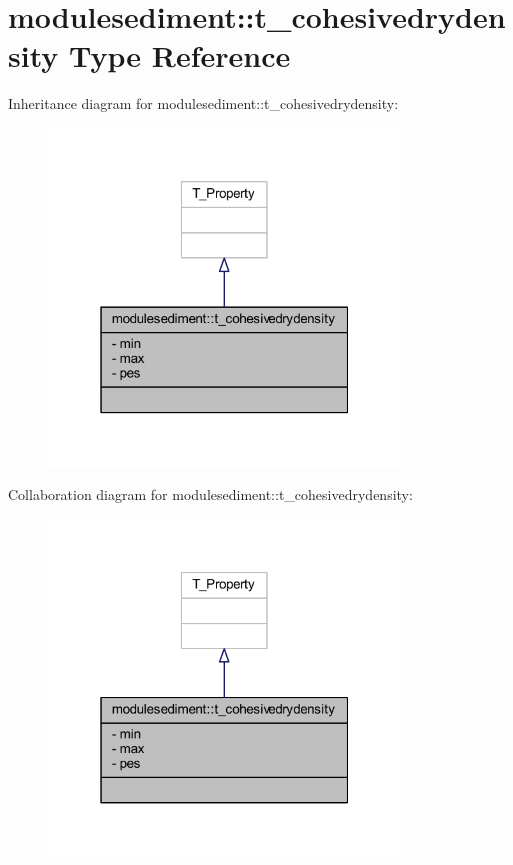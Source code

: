 \hypertarget{structmodulesediment_1_1t__cohesivedrydensity}{}\section{modulesediment\+:\+:t\+\_\+cohesivedrydensity Type Reference}
\label{structmodulesediment_1_1t__cohesivedrydensity}


Inheritance diagram for modulesediment\+:\+:t\+\_\+cohesivedrydensity\+:\nopagebreak
\begin{figure}[H]
\begin{center}
\leavevmode
\includegraphics[width=265pt]{structmodulesediment_1_1t__cohesivedrydensity__inherit__graph}
\end{center}
\end{figure}


Collaboration diagram for modulesediment\+:\+:t\+\_\+cohesivedrydensity\+:\nopagebreak
\begin{figure}[H]
\begin{center}
\leavevmode
\includegraphics[width=265pt]{structmodulesediment_1_1t__cohesivedrydensity__coll__graph}
\end{center}
\end{figure}
